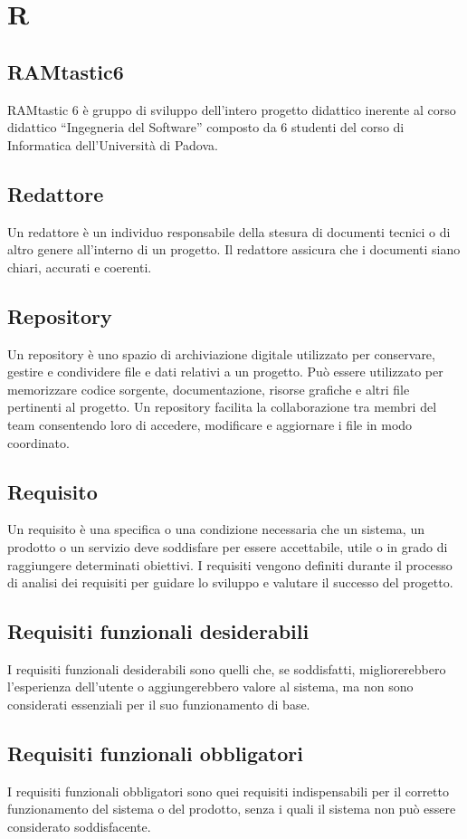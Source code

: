 \section{R} 
\subsection{RAMtastic6} 
RAMtastic 6 è gruppo di sviluppo dell’intero progetto didattico inerente al corso didattico “Ingegneria del Software” composto da 6 studenti del corso di Informatica dell’Università di Padova.
\subsection{Redattore} 
Un redattore è un individuo responsabile della stesura di documenti tecnici o di altro genere all'interno di un progetto. Il redattore assicura che i documenti siano chiari, accurati e coerenti. 
\subsection{Repository} 
Un repository è uno spazio di archiviazione digitale utilizzato per conservare, gestire e condividere file e dati relativi a un progetto. Può essere utilizzato per memorizzare codice sorgente, documentazione, risorse grafiche e altri file pertinenti al progetto. Un repository facilita la collaborazione tra membri del team consentendo loro di accedere, modificare e aggiornare i file in modo coordinato. 
\subsection{Requisito} 
Un requisito è una specifica o una condizione necessaria che un sistema, un prodotto o un servizio deve soddisfare per essere accettabile, utile o in grado di raggiungere determinati obiettivi. I requisiti vengono definiti durante il processo di analisi dei requisiti per guidare lo sviluppo e valutare il successo del progetto. 
\subsection{Requisiti funzionali desiderabili} 
I requisiti funzionali desiderabili sono quelli che, se soddisfatti, migliorerebbero l'esperienza dell'utente o aggiungerebbero valore al sistema, ma non sono considerati essenziali per il suo funzionamento di base. 
\subsection{Requisiti funzionali obbligatori} 
I requisiti funzionali obbligatori sono quei requisiti indispensabili per il corretto funzionamento del sistema o del prodotto, senza i quali il sistema non può essere considerato soddisfacente. 
